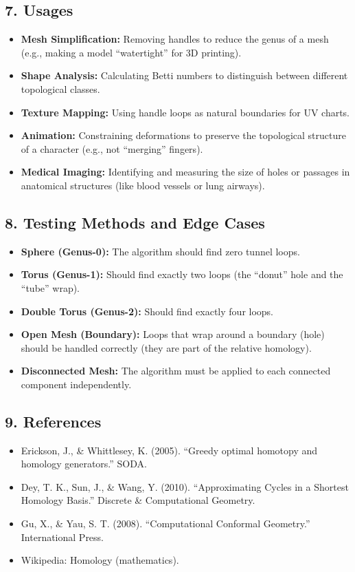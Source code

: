 \subsection{7. Usages}

\begin{itemize}
    \item \textbf{Mesh Simplification:} Removing handles to reduce the genus of a mesh (e.g., making a model ``watertight'' for 3D printing).
    \item \textbf{Shape Analysis:} Calculating Betti numbers to distinguish between different topological classes.
    \item \textbf{Texture Mapping:} Using handle loops as natural boundaries for UV charts.
    \item \textbf{Animation:} Constraining deformations to preserve the topological structure of a character (e.g., not ``merging'' fingers).
    \item \textbf{Medical Imaging:} Identifying and measuring the size of holes or passages in anatomical structures (like blood vessels or lung airways).
\end{itemize}

\subsection{8. Testing Methods and Edge Cases}

\begin{itemize}
    \item \textbf{Sphere (Genus-0):} The algorithm should find zero tunnel loops.
    \item \textbf{Torus (Genus-1):} Should find exactly two loops (the ``donut'' hole and the ``tube'' wrap).
    \item \textbf{Double Torus (Genus-2):} Should find exactly four loops.
    \item \textbf{Open Mesh (Boundary):} Loops that wrap around a boundary (hole) should be handled correctly (they are part of the relative homology).
    \item \textbf{Disconnected Mesh:} The algorithm must be applied to each connected component independently.
\end{itemize}

\subsection{9. References}

\begin{itemize}
    \item Erickson, J., \& Whittlesey, K. (2005). ``Greedy optimal homotopy and homology generators.'' SODA.
    \item Dey, T. K., Sun, J., \& Wang, Y. (2010). ``Approximating Cycles in a Shortest Homology Basis.'' Discrete \& Computational Geometry.
    \item Gu, X., \& Yau, S. T. (2008). ``Computational Conformal Geometry.'' International Press.
    \item Wikipedia: Homology (mathematics).
\end{itemize}

